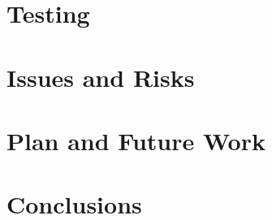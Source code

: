 \documentclass[a4paper, 12pt]{article}
\begin{document}
\section{Testing}
\section{Issues and Risks}
\section{Plan and Future Work}
\section{Conclusions}
\end{document}
